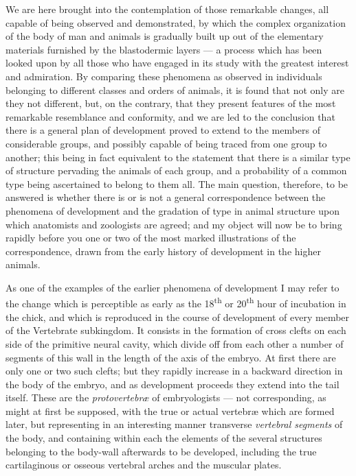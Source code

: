 \documentclass[a4paper, 11pt, oneside, english]{article}
\begin{document}
We are here brought into the contemplation of those remarkable changes, all capable of being observed and demonstrated, by which the complex organization of the body of man and animals is gradually built up out of the elementary materials furnished by the blastodermic layers --- a process which has been looked upon by all those who have engaged in its study with the greatest interest and admiration. By comparing these phenomena as observed in individuals belonging to different classes and orders of animals, it is found that not only are they not different, but, on the contrary, that they present features of the most remarkable resemblance and conformity, and we are led to the conclusion that there is a general plan of development proved to extend to the members of considerable groups, and possibly capable of being traced from one group to another; this being in fact equivalent to the statement that there is a similar type of structure pervading the animals of each group, and a probability of a common type being ascertained to belong to them all. The main question, therefore, to be answered is whether there is or is not a general correspondence between the phenomena of development and the gradation of type in animal structure upon which anatomists and zoologists are agreed; and my object will now be to bring rapidly before you one or two of the most marked illustrations of the correspondence, drawn from the early history of development in the higher animals.

As one of the examples of the earlier phenomena of development I may refer to the change which is perceptible as early as the 18\textsuperscript{th} or 20\textsuperscript{th} hour of incubation in the chick, and which is reproduced in the course of development of every member of the Vertebrate subkingdom. It consists in the formation of cross clefts on each side of the primitive neural cavity, which divide off from each other a number of segments of this wall in the length of the axis of the embryo. At first there are only one or two such clefts; but they rapidly increase in a backward direction in the body of the embryo, and as development proceeds they extend into the tail itself. These are the \emph{protovertebræ} of embryologists --- not corresponding, as might at first be supposed, with the true or actual vertebræ which are formed later, but representing in an interesting manner transverse \emph{vertebral segments} of the body, and containing within each the elements of the several structures belonging to the body-wall afterwards to be developed, including the true cartilaginous or osseous vertebral arches and the muscular plates.
\end{document}
